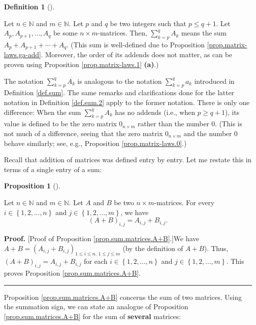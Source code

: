 \documentclass[numbers=enddot,12pt,final,onecolumn,notitlepage]{scrartcl}%
\theoremstyle{definition}
\newtheorem{prop}[theo]{Proposition}
\newenvironment{proposition}[1][]
{\begin{prop}[#1]\begin{leftbar}}
{\end{leftbar}\end{prop}}
\newtheorem{defi}[theo]{Definition}
\newenvironment{definition}[1][]
{\begin{defi}[#1]\begin{leftbar}}
{\end{leftbar}\end{defi}}
\newenvironment{proof}[1][Proof]{\noindent\textbf{#1.} }{\ \rule{0.5em}{0.5em}}
\let\sumnonlimits\sum
\renewcommand{\sum}{\sumnonlimits\limits}
\begin{document}
\begin{definition}
\label{def.sum.matrices}Let $n\in\mathbb{N}$ and $m\in\mathbb{N}$. Let $p$ and
$q$ be two integers such that $p\leq q+1$. Let $A_{p},A_{p+1},\ldots,A_{q}$ be
some $n\times m$-matrices. Then, $\sum_{k=p}^{q}A_{k}$ means the sum
$A_{p}+A_{p+1}+\cdots+A_{q}$. (This sum is well-defined due to Proposition
\ref{prop.matrix-laws.ga-add}. Moreover, the order of its addends does not
matter, as can be proven using Proposition \ref{prop.matrix-laws.1}
\textbf{(a)}.)

The notation $\sum_{k=p}^{q}A_{k}$ is analogous to the notation $\sum
_{k=p}^{q}a_{k}$ introduced in Definition \ref{def.sum}. The same remarks and
clarifications done for the latter notation in Definition \ref{def.sum.2}
apply to the former notation. There is only one difference: When the sum
$\sum_{k=p}^{q}A_{k}$ has no addends (i.e., when $p\geq q+1$), its value is
defined to be the zero matrix $0_{n\times m}$ rather than the number $0$.
(This is not much of a difference, seeing that the zero matrix $0_{n\times m}$
and the number $0$ behave similarly; see, e.g., Proposition
\ref{prop.matrix-laws.0}.)
\end{definition}

Recall that addition of matrices was defined entry by entry. Let me restate
this in terms of a single entry of a sum:

\begin{proposition}
\label{prop.sum.matrices.A+B}Let $n\in\mathbb{N}$ and $m\in\mathbb{N}$. Let
$A$ and $B$ be two $n\times m$-matrices. For every $i\in\left\{
1,2,\ldots,n\right\}  $ and $j\in\left\{  1,2,\ldots,m\right\}  $, we have%
\[
\left(  A+B\right)  _{i,j}=A_{i,j}+B_{i,j}.
\]

\end{proposition}

\begin{proof}
[Proof of Proposition \ref{prop.sum.matrices.A+B}.]We have $A+B=\left(
A_{i,j}+B_{i,j}\right)  _{1\leq i\leq n,\ 1\leq j\leq m}$ (by the definition
of $A+B$). Thus, $\left(  A+B\right)  _{i,j}=A_{i,j}+B_{i,j}$ for each
$i\in\left\{  1,2,\ldots,n\right\}  $ and $j\in\left\{  1,2,\ldots,m\right\}
$. This proves Proposition \ref{prop.sum.matrices.A+B}.
\end{proof}

Proposition \ref{prop.sum.matrices.A+B} concerns the sum of two matrices.
Using the summation sign, we can state an analogue of Proposition
\ref{prop.sum.matrices.A+B} for the sum of \textbf{several} matrices:
\end{document}
